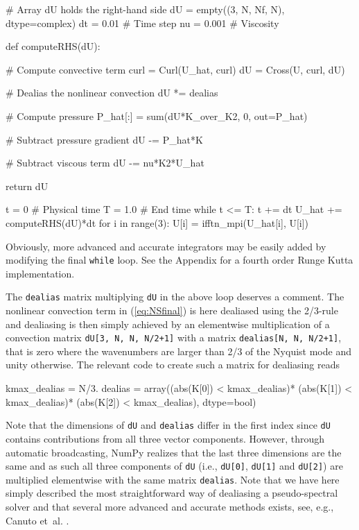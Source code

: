 \documentclass[final,3p,times,twocolumn]{elsarticle}
\newcommand{\inpyth}{\lstinline[style=inlinestyle]}
\begin{document}
\begin{python}
# Array dU holds the right-hand side
dU = empty((3, N, Nf, N), dtype=complex)  
dt = 0.01    # Time step
nu = 0.001   # Viscosity

def computeRHS(dU):

    # Compute convective term
    curl = Curl(U_hat, curl)
    dU = Cross(U, curl, dU)

    # Dealias the nonlinear convection
    dU *= dealias

    # Compute pressure
    P_hat[:] = sum(dU*K_over_K2, 0, 
                   out=P_hat)

    # Subtract pressure gradient
    dU -= P_hat*K

    # Subtract viscous term
    dU -= nu*K2*U_hat

    return dU

t = 0        # Physical time
T = 1.0      # End time
while t <= T:
    t += dt
    U_hat += computeRHS(dU)*dt
    for i in range(3):
        U[i] = ifftn_mpi(U_hat[i], U[i])

\end{python}
Obviously, more advanced and accurate integrators may be easily added by modifying the final \inpyth{while} loop. See the Appendix for a fourth order Runge Kutta implementation.

The \inpyth{dealias} matrix multiplying \inpyth{dU} in the above
loop deserves a comment.
The nonlinear convection term in (\ref{eq:NSfinal}) is here dealiased using the 2/3-rule \cite{orzag71} and dealiasing is then simply achieved by an elementwise multiplication of a convection matrix \inpyth{dU[3, N, N, N/2+1]} with a matrix \inpyth{dealias[N, N, N/2+1]}, that is zero where the wavenumbers are larger than 2/3 of the Nyquist mode and unity otherwise. The relevant code to create such a matrix for dealiasing reads

\begin{python}
kmax_dealias = N/3.
dealias = array((abs(K[0]) < kmax_dealias)*
                (abs(K[1]) < kmax_dealias)*
                (abs(K[2]) < kmax_dealias), 
                dtype=bool)
\end{python}
Note that the dimensions of \inpyth{dU} and \inpyth{dealias} differ in the 
first index since \inpyth{dU} contains contributions from all three vector 
components. However, through automatic broadcasting, NumPy realizes that the 
last three dimensions are the same and as such all three components of 
\inpyth{dU} (i.e.,  \inpyth{dU[0]}, \inpyth{dU[1]} and  \inpyth{dU[2]}) are 
multiplied elementwise with the same matrix \inpyth{dealias}. Note that we have 
here simply described the most straightforward way of dealiasing a 
pseudo-spectral solver and that several more advanced and accurate methods 
exists, see, e.g., Canuto et~al. \cite{canuto1988}.
\end{document}
